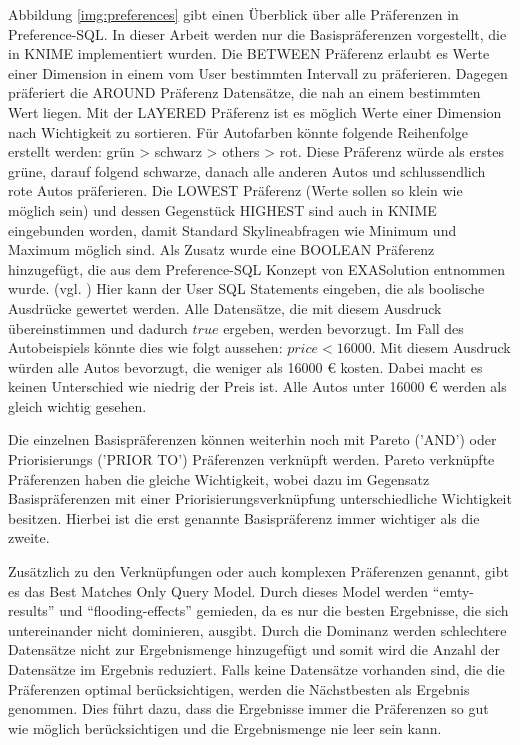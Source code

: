 Abbildung \ref{img:preferences} gibt einen Überblick über alle Präferenzen in Preference-SQL. In dieser Arbeit werden nur die Basispräferenzen vorgestellt, die in KNIME implementiert wurden. Die BETWEEN Präferenz erlaubt es Werte einer Dimension in einem vom User bestimmten Intervall zu präferieren. Dagegen präferiert die AROUND Präferenz Datensätze, die nah an einem bestimmten Wert liegen. Mit der LAYERED Präferenz ist es möglich Werte einer Dimension nach Wichtigkeit zu sortieren. Für Autofarben könnte folgende Reihenfolge erstellt werden: grün > schwarz > others > rot. Diese Präferenz würde als erstes grüne, darauf folgend schwarze, danach alle anderen Autos und schlussendlich rote Autos präferieren.
Die LOWEST Präferenz (Werte sollen so klein wie möglich sein) und dessen Gegenstück HIGHEST sind auch in KNIME eingebunden worden, damit Standard Skylineabfragen wie Minimum und Maximum möglich sind.
Als Zusatz wurde eine BOOLEAN Präferenz hinzugefügt, die aus dem Preference-SQL Konzept von EXASolution entnommen wurde. (vgl. \cite{EXASolution}) Hier kann der User SQL Statements eingeben, die als boolische Ausdrücke gewertet werden. Alle Datensätze, die mit diesem Ausdruck übereinstimmen und dadurch $true$ ergeben, werden bevorzugt. Im Fall des Autobeispiels könnte dies wie folgt aussehen: $price < 16000$. Mit diesem Ausdruck würden alle Autos bevorzugt, die weniger als 16000 \euro{} kosten. Dabei macht es keinen Unterschied wie niedrig der Preis ist. Alle Autos unter 16000 \euro{} werden als gleich wichtig gesehen. 

Die einzelnen Basispräferenzen können weiterhin noch mit Pareto ('AND') oder Priorisierungs ('PRIOR TO') Präferenzen verknüpft werden. Pareto verknüpfte Präferenzen haben die gleiche Wichtigkeit, wobei dazu im Gegensatz Basispräferenzen mit einer Priorisierungsverknüpfung unterschiedliche Wichtigkeit besitzen. Hierbei ist die erst genannte Basispräferenz immer wichtiger als die zweite.  

Zusätzlich zu den Verknüpfungen oder auch komplexen Präferenzen genannt, gibt es das Best Matches Only Query Model. Durch dieses Model werden \enquote{emty-results} und \enquote{flooding-effects} gemieden, da es nur die besten Ergebnisse, die sich untereinander nicht dominieren, ausgibt. Durch die Dominanz werden schlechtere Datensätze nicht zur Ergebnismenge hinzugefügt und somit wird die Anzahl der Datensätze im Ergebnis reduziert. Falls keine Datensätze vorhanden sind, die die Präferenzen optimal berücksichtigen, werden die Nächstbesten als Ergebnis genommen. Dies führt dazu, dass die Ergebnisse immer die Präferenzen so gut wie möglich berücksichtigen und die Ergebnismenge nie leer sein kann.

